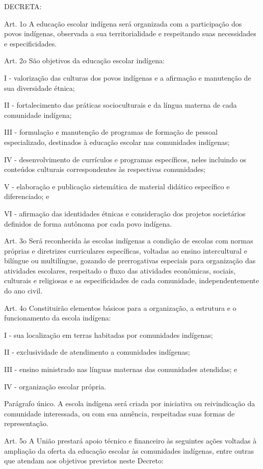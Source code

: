 \documentclass[
]{book}
\begin{document}
DECRETA:

Art. 1o A educação escolar indígena será organizada com a participação dos povos indígenas, observada a sua territorialidade e respeitando suas necessidades e especificidades.

Art. 2o São objetivos da educação escolar indígena:

I - valorização das culturas dos povos indígenas e a afirmação e manutenção de sua diversidade étnica;

II - fortalecimento das práticas socioculturais e da língua materna de cada comunidade indígena;

III - formulação e manutenção de programas de formação de pessoal especializado, destinados à educação escolar nas comunidades indígenas;

IV - desenvolvimento de currículos e programas específicos, neles incluindo os conteúdos culturais correspondentes às respectivas comunidades;

V - elaboração e publicação sistemática de material didático específico e diferenciado; e

VI - afirmação das identidades étnicas e consideração dos projetos societários definidos de forma autônoma por cada povo indígena.

Art. 3o Será reconhecida às escolas indígenas a condição de escolas com normas próprias e diretrizes curriculares específicas, voltadas ao ensino intercultural e bilíngue ou multilíngue, gozando de prerrogativas especiais para organização das atividades escolares, respeitado o fluxo das atividades econômicas, sociais, culturais e religiosas e as especificidades de cada comunidade, independentemente do ano civil.

Art. 4o Constituirão elementos básicos para a organização, a estrutura e o funcionamento da escola indígena:

I - sua localização em terras habitadas por comunidades indígenas;

II - exclusividade de atendimento a comunidades indígenas;

III - ensino ministrado nas línguas maternas das comunidades atendidas; e

IV - organização escolar própria.

Parágrafo único. A escola indígena será criada por iniciativa ou reivindicação da comunidade interessada, ou com sua anuência, respeitadas suas formas de representação.

Art. 5o A União prestará apoio técnico e financeiro às seguintes ações voltadas à ampliação da oferta da educação escolar às comunidades indígenas, entre outras que atendam aos objetivos previstos neste Decreto:
\end{document}
